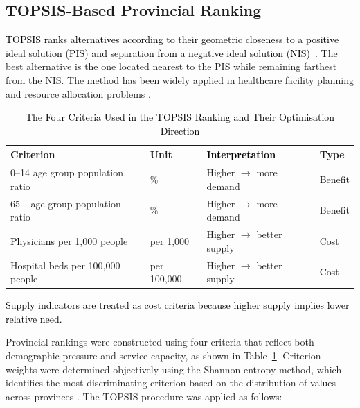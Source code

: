 \documentclass[final, 9pt, twocolumn]{saucis}
\newcommand{\rev}[1]{\textcolor{black}{#1}}
\begin{document}
\subsection{TOPSIS-Based Provincial Ranking}

\rev{TOPSIS ranks alternatives according to their geometric closeness to a positive ideal solution (PIS) and separation from a negative ideal solution (NIS)}~\cite{result3}. The best alternative is the one located nearest to the PIS while remaining farthest from the NIS. The method has been widely applied in healthcare facility planning and resource allocation problems \cite{result4}.

\begin{table}[h]
\centering
\caption{\rev{The Four Criteria Used in the TOPSIS Ranking and Their Optimisation Direction}}
\label{tab:topsis_criteria}
\begin{threeparttable}
\begin{tabular}{p{3cm} p{1cm} p{2.2cm} p{1cm}}
\hline
\textbf{Criterion} & \textbf{Unit} & \textbf{\rev{Interpretation}} & \textbf{Type} \\
\hline
0--14 age group population ratio & \%          & Higher $\rightarrow$ more demand    & Benefit \\
65+ age group population ratio   & \%          & Higher $\rightarrow$ more demand    & Benefit \\
\rev{Physicians} per 1,000 people & per 1,000   & Higher $\rightarrow$ better supply  & Cost \\
Hospital beds per 100,000 people & per 100,000 & Higher $\rightarrow$ better supply  & Cost \\
\hline
\end{tabular}
\begin{tablenotes}
\footnotesize
\item \rev{Supply indicators are treated as cost criteria because higher supply implies lower relative need.}
\end{tablenotes}
\end{threeparttable}
\end{table}

Provincial rankings were constructed using four criteria that reflect both demographic pressure and service capacity, as shown in Table~\ref{tab:topsis_criteria}. Criterion weights were determined objectively using the Shannon entropy method, which identifies the most discriminating criterion based on the distribution of values across provinces \cite{result3}. The TOPSIS procedure was applied as follows:
\end{document}
